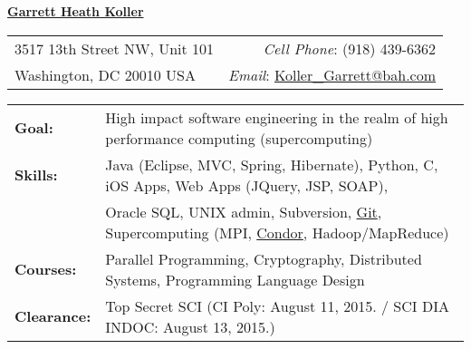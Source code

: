 \documentclass[11pt, letterpaper]{letter}
\newlength{\firstSectionSpacing}	\setlength{\firstSectionSpacing}{6pt}
\newlength{\sectionSpacing}			\setlength{\sectionSpacing}{-1pt}
\begin{document}
\sffamily

\begin{center}
\underline{\Large{\textbf{Garrett Heath Koller}}}
\end{center}
\vspace{-8pt}
\begin{tabular*}{\textwidth}{l@{\extracolsep{\fill}}r}
3517 13th Street NW, Unit 101 & \textit{Cell Phone}: (918) 439-6362 \\
Washington, DC  20010 USA & \textit{Email}:
\href{mailto:Koller_Garrett@bah.com}{Koller\_Garrett@bah.com} \\
\hline
\end{tabular*}

\vspace{\firstSectionSpacing}


\begin{tabular*}{\textwidth}{ p{2.2cm} l }
{\large \textbf{Goal:}}		& High impact software engineering in the realm of 
							  high performance computing (supercomputing) \\
{\large \textbf{Skills:}}		& Java (Eclipse, MVC, Spring, Hibernate), Python, C,
							  iOS Apps, Web Apps (JQuery, JSP, SOAP), \\
							& Oracle SQL, UNIX admin, Subversion, 
							  \href{https://github.com/garrettheath4}{Git},
							  Supercomputing (MPI, \href{http://www.htcondorproject.org/}{Condor},
							  Hadoop/MapReduce) \\
{\large \textbf{Courses:}}		& Parallel Programming, Cryptography, 
							  Distributed Systems, Programming Language Design \\
{\large \textbf{Clearance:}}	& Top Secret SCI (CI Poly: August 11, 2015.  /  SCI DIA INDOC: August 13, 2015.)
\end{tabular*}

\vspace{\firstSectionSpacing}
\vspace{\sectionSpacing}

\end{document}
